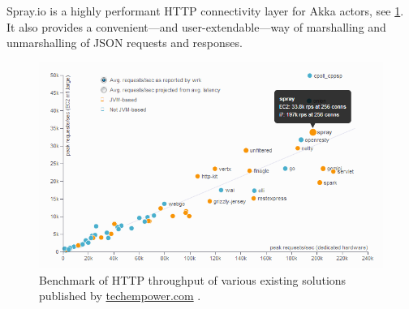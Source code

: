 Spray.io is a highly performant HTTP connectivity layer for Akka actors, see \cref{fig:spray-benchmark}. It also provides a convenient---and user-extendable---way of marshalling and unmarshalling of JSON requests and responses.

\begin{figure}[h]
	\centering
	\includegraphics[width=\textwidth]{graphics-spray-benchmark}
	\caption{Benchmark of HTTP throughput of various existing solutions published by \href{http://www.techempower.com}{techempower.com} \cite{Spray:2013:Benchmark}.}
	\label{fig:spray-benchmark}
\end{figure}
